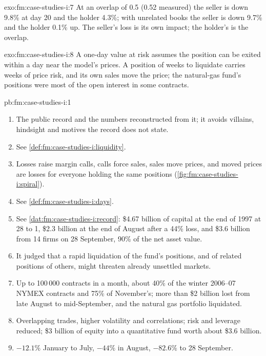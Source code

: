 \begin{solution}{exo:fm:case-studies-i:7}
At an overlap of 0.5 (0.52 measured) the seller is down 9.8\% at day 20 and the holder 4.3\%; with unrelated books the seller is down 9.7\% and the
holder 0.1\% up. The seller's loss is its own impact; the holder's is the overlap.
\end{solution}

\begin{solution}{exo:fm:case-studies-i:8}
A one-day value at risk assumes the position can be exited within a day near the model's prices. A position of weeks to liquidate carries weeks of
price risk, and its own sales move the price; the natural-gas fund's positions were most of the open interest in some contracts.
\end{solution}

\begin{solution}{pb:fm:case-studies-i:1}
\begin{enumerate}
\item The public record and the numbers reconstructed from it; it avoids villains, hindsight and motives the record does not state.
\item See \cref{def:fm:case-studies-i:liquidity}.
\item Losses raise margin calls, calls force sales, sales move prices, and moved prices are losses for everyone holding the same positions
(\cref{fig:fm:case-studies-i:spiral}).
\item See \cref{def:fm:case-studies-i:days}.
\item See \cref{dat:fm:case-studies-i:record}: \$4.67 billion of capital at the end of 1997 at 28 to 1, \$2.3 billion at the end of August after a
44\% loss, and \$3.6 billion from 14 firms on 28 September, 90\% of the net asset value.
\item It judged that a rapid liquidation of the fund's positions, and of related positions of others, might threaten already unsettled markets.
\item Up to 100\,000 contracts in a month, about 40\% of the winter 2006--07 NYMEX contracts and 75\% of November's; more than \$2 billion lost from
late August to mid-September, and the natural gas portfolio liquidated.
\item Overlapping trades, higher volatility and correlations; risk and leverage reduced; \$3 billion of equity into a quantitative fund worth about
\$3.6 billion.
\item $-12.1\%$ January to July, $-44\%$ in August, $-82.6\%$ to 28 September.

\end{enumerate}
\end{solution}
